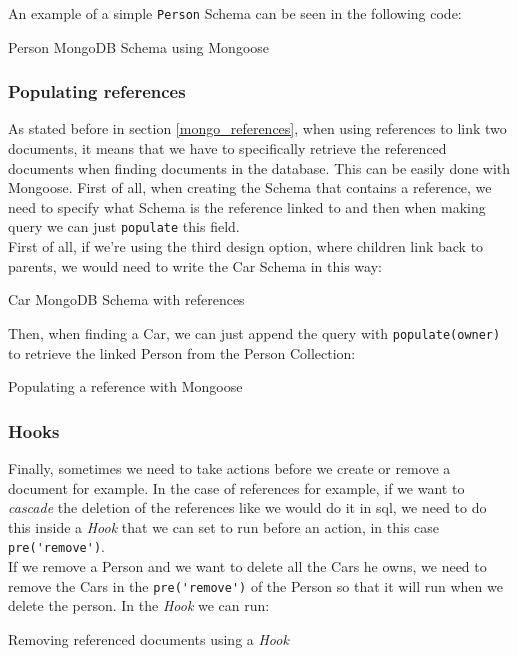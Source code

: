 \documentclass[twoside, openright,11pt,a4paper]{book}
\newenvironment{code}{\captionsetup{type=listing}}{}
\begin{document}
An example of a simple \verb+Person+ Schema can be seen in the following code:
\begin{code}
	\caption{Person MongoDB Schema using Mongoose}
\end{code}
\subsubsection{Populating references}
\label{populating_refs}
As stated before in section \ref{mongo_references}, when using references to link two documents, it means that we have to specifically retrieve the referenced documents when finding documents in the database. This can be easily done with Mongoose. First of all, when creating the Schema that contains a reference, we need to specify what Schema is the reference linked to and then when making query we can just \verb+populate+ this field. \\

First of all, if we're using the third design option, where children link back to parents, we would need to write the Car Schema in this way:
\begin{code}
	\caption{Car MongoDB Schema with references}
\end{code}

Then, when finding a Car, we can just append the query with \verb+populate(owner)+ to retrieve the linked Person from the Person Collection:
\begin{code}
	\caption{Populating a reference with Mongoose}
	\label{populating_mongo_code}
\end{code}
\subsubsection{Hooks}
\label{mongoose_hooks}
Finally, sometimes we need to take actions before we create or remove a document for example. In the case of references for example, if we want to \emph{cascade} the deletion of the references like we would do it in \gls{sql}, we need to do this inside a \emph{Hook} that we can set to run before an action, in this case \verb+pre('remove')+.\\

If we remove a Person and we want to delete all the Cars he owns, we need to remove the Cars in the \verb+pre('remove')+ of the Person so that it will run when we delete the person. In the \emph{Hook} we can run:
\begin{code}
	\caption{Removing referenced documents using a \emph{Hook}}
\end{code}
\end{document}
